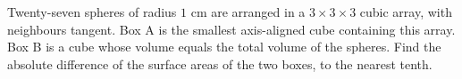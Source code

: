 Twenty-seven spheres of radius $1$ cm are arranged in a $3\times3\times3$ cubic array, with neighbours tangent. Box A is the smallest axis-aligned cube containing this array. Box B is a cube whose volume equals the total volume of the spheres. Find the absolute difference of the surface areas of the two boxes, to the nearest tenth.
